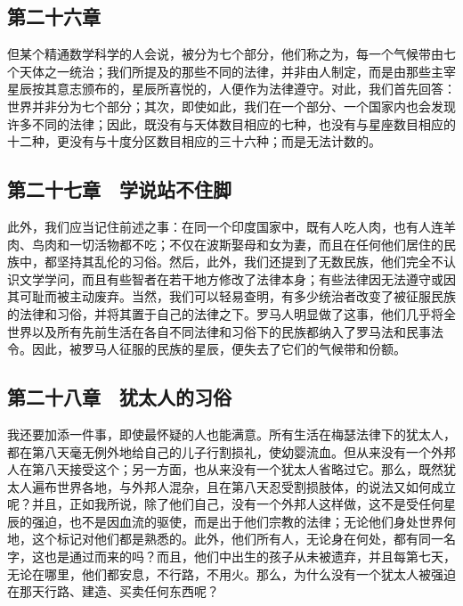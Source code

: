 \subsection{第二十六章　}

但某个精通数学科学的人会说，被分为七个部分，他们称之为，每一个气候带由七个天体之一统治；我们所提及的那些不同的法律，并非由人制定，而是由那些主宰星辰按其意志颁布的，星辰所喜悦的，人便作为法律遵守。对此，我们首先回答：世界并非分为七个部分；其次，即使如此，我们在一个部分、一个国家内也会发现许多不同的法律；因此，既没有与天体数目相应的七种，也没有与星座数目相应的十二种，更没有与十度分区数目相应的三十六种；而是无法计数的。\par


\subsection{第二十七章　学说站不住脚}

此外，我们应当记住前述之事：在同一个印度国家中，既有人吃人肉，也有人连羊肉、鸟肉和一切活物都不吃；不仅在波斯娶母和女为妻，而且在任何他们居住的民族中，都坚持其乱伦的习俗。然后，此外，我们还提到了无数民族，他们完全不认识文学学问，而且有些智者在若干地方修改了法律本身；有些法律因无法遵守或因其可耻而被主动废弃。当然，我们可以轻易查明，有多少统治者改变了被征服民族的法律和习俗，并将其置于自己的法律之下。罗马人明显做了这事，他们几乎将全世界以及所有先前生活在各自不同法律和习俗下的民族都纳入了罗马法和民事法令。因此，被罗马人征服的民族的星辰，便失去了它们的气候带和份额。\par


\subsection{第二十八章　犹太人的习俗}

我还要加添一件事，即使最怀疑的人也能满意。所有生活在梅瑟法律下的犹太人，都在第八天毫无例外地给自己的儿子行割损礼，使幼婴流血。但从来没有一个外邦人在第八天接受这个；另一方面，也从来没有一个犹太人省略过它。那么，既然犹太人遍布世界各地，与外邦人混杂，且在第八天忍受割损肢体，的说法又如何成立呢？并且，正如我所说，除了他们自己，没有一个外邦人这样做，这不是受任何星辰的强迫，也不是因血流的驱使，而是出于他们宗教的法律；无论他们身处世界何地，这个标记对他们都是熟悉的。此外，他们所有人，无论身在何处，都有同一名字，这也是通过而来的吗？而且，他们中出生的孩子从未被遗弃，并且每第七天，无论在哪里，他们都安息，不行路，不用火。那么，为什么没有一个犹太人被强迫在那天行路、建造、买卖任何东西呢？\par

